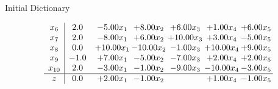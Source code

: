 \documentclass[8pt]{article}
\begin{document}
Initial Dictionary 

\[\begin{array}{c| c c@{\hskip 2pt} c@{\hskip 2pt} c@{\hskip 2pt} c@{\hskip 2pt} c@{\hskip 2pt} }
 x_{6}   &  2.0 & -5.00 x_{1} & +  8.00 x_{2} & +  6.00 x_{3} & +  1.00 x_{4} & +  6.00 x_{5}\\
 x_{7}   &  2.0 & -8.00 x_{1} & +  6.00 x_{2} & + 10.00 x_{3} & +  3.00 x_{4} & -5.00 x_{5}\\
 x_{8}   &  0.0 & + 10.00 x_{1} & -10.00 x_{2} & -1.00 x_{3} & + 10.00 x_{4} & +  9.00 x_{5}\\
 x_{9}   &  -1.0 & +  7.00 x_{1} & -5.00 x_{2} & -7.00 x_{3} & +  2.00 x_{4} & +  2.00 x_{5}\\
 x_{10}   &  2.0 & -3.00 x_{1} & -1.00 x_{2} & -9.00 x_{3} & -10.00 x_{4} & -3.00 x_{5}\\
\hline
z    &  0.0 & +  2.00 x_{1} & -1.00 x_{2} &   & +  1.00 x_{4} & -1.00 x_{5}\\
\end{array}\]
\end{document}
